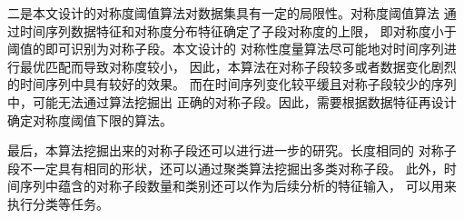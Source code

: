 二是本文设计的对称度阈值算法对数据集具有一定的局限性。对称度阈值算法
通过时间序列数据特征和对称度分布特征确定了子段对称度的上限，
即对称度小于阈值的即可识别为对称子段。本文设计的
对称性度量算法尽可能地对时间序列进行最优匹配而导致对称度较小，
因此，本算法在对称子段较多或者数据变化剧烈的时间序列中具有较好的效果。
而在时间序列变化较平缓且对称子段较少的序列中，可能无法通过算法挖掘出
正确的对称子段。因此，需要根据数据特征再设计确定对称度阈值下限的算法。

最后，本算法挖掘出来的对称子段还可以进行进一步的研究。长度相同的
对称子段不一定具有相同的形状，还可以通过聚类算法挖掘出多类对称子段。
此外，时间序列中蕴含的对称子段数量和类别还可以作为后续分析的特征输入，
可以用来执行分类等任务。




